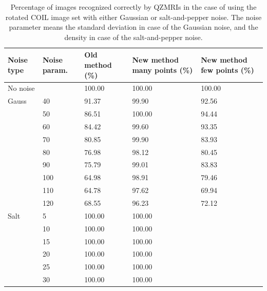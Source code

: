 \begin{table}
    \centering
    \begin{tabular}{|p{2.15cm}|p{1.8cm}|p{3cm}|p{2.74cm}|p{2.6cm}|} \hline
        \textbf{Noise type} & \textbf{Noise param.} & \textbf{Old method} (\%) & \textbf{New method} many points (\%)& \textbf{New method} few points (\%) \\ \hline\hline
        No noise & & 100.00 & 100.00 & 100.00 \\ \hline\hline
        Gauss & 40 & 91.37 & 99.90 & 92.56 \\ \cline{2-5}
        & 50 & 86.51 & 100.00 & 94.44 \\ \cline{2-5}
        & 60 & 84.42 & 99.60 & 93.35 \\ \cline{2-5}
        & 70 & 80.85 & 99.90 & 83.93 \\ \cline{2-5}
        & 80 & 76.98 & 98.12 & 80.45 \\ \cline{2-5}
        & 90 & 75.79 & 99.01 & 83.83 \\ \cline{2-5}
        & 100 & 64.98 & 98.91 & 79.46 \\ \cline{2-5}
        & 110 & 64.78 & 97.62 & 69.94 \\ \cline{2-5}
        & 120 & 68.55 & 96.23 & 72.12 \\ \hline\hline
        Salt & 5 & 100.00 & 100.00 & \\ \cline{2-5}
        & 10 & 100.00 & 100.00 &  \\ \cline{2-5}
        & 15 & 100.00 & 100.00 &  \\ \cline{2-5}
        & 20 & 100.00 & 100.00 &  \\ \cline{2-5}
        & 25 & 100.00 & 100.00 &  \\ \cline{2-5}
        & 30 & 100.00 & 100.00 &  \\ \cline{1-5}
    \end{tabular}
    \caption{Percentage of images recognized correctly by QZMRIs in the case of using the rotated COIL image set with either Gaussian or salt-and-pepper noise. The noise parameter means the standard deviation in case of the Gaussian noise, and the density in case of the salt-and-pepper noise.}
    \label{tab:recognition_rot}
\end{table}

